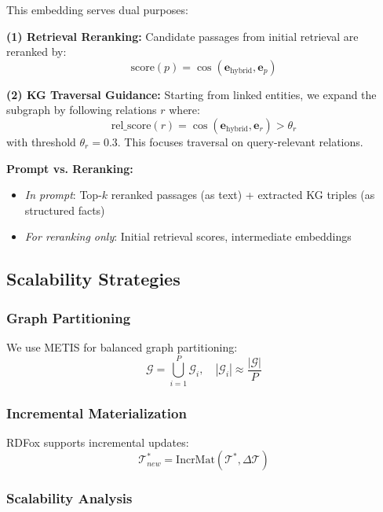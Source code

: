\documentclass[10pt,twocolumn]{article}
\begin{document}
This embedding serves dual purposes:

\textbf{(1) Retrieval Reranking:} Candidate passages from initial retrieval are reranked by:
\begin{equation}
\text{score}(p) = \cos(\mathbf{e}_{\text{hybrid}}, \mathbf{e}_p)
\end{equation}

\textbf{(2) KG Traversal Guidance:} Starting from linked entities, we expand the subgraph by following relations $r$ where:
\begin{equation}
\text{rel\_score}(r) = \cos(\mathbf{e}_{\text{hybrid}}, \mathbf{e}_r) > \theta_r
\end{equation}
with threshold $\theta_r = 0.3$. This focuses traversal on query-relevant relations.

\textbf{Prompt vs. Reranking:}
\begin{itemize}
    \item \textit{In prompt}: Top-$k$ reranked passages (as text) + extracted KG triples (as structured facts)
    \item \textit{For reranking only}: Initial retrieval scores, intermediate embeddings
\end{itemize}


\subsection{Scalability Strategies}
\label{sec:scale}

\subsubsection{Graph Partitioning}
We use METIS \cite{karypis1998metis} for balanced graph partitioning:
\begin{equation}
\mathcal{G} = \bigcup_{i=1}^{P} \mathcal{G}_i, \quad |\mathcal{G}_i| \approx \frac{|\mathcal{G}|}{P}
\end{equation}

\subsubsection{Incremental Materialization}
RDFox supports incremental updates:
\begin{equation}
\mathcal{T}^*_{new} = \text{IncrMat}(\mathcal{T}^*, \Delta\mathcal{T})
\end{equation}

\subsubsection{Scalability Analysis}
\end{document}

